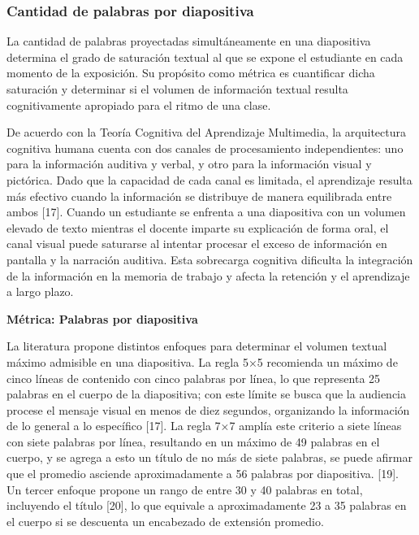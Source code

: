 \documentclass[11pt]{article}
\begin{document}
\subsubsection*{Cantidad de palabras por diapositiva}

La cantidad de palabras proyectadas simultáneamente en una diapositiva determina el grado de saturación textual al que se expone el estudiante en cada momento de la exposición. Su propósito como métrica es cuantificar dicha saturación y determinar si el volumen de información textual resulta cognitivamente apropiado para el ritmo de una clase.

De acuerdo con la Teoría Cognitiva del Aprendizaje Multimedia, la arquitectura cognitiva humana cuenta con dos canales de procesamiento independientes: uno para la información auditiva y verbal, y otro para la información visual y pictórica. Dado que la capacidad de cada canal es limitada, el aprendizaje resulta más efectivo cuando la información se distribuye de manera equilibrada entre ambos [17]. Cuando un estudiante se enfrenta a una diapositiva con un volumen elevado de texto mientras el docente imparte su explicación de forma oral, el canal visual puede saturarse al intentar procesar el exceso de información en pantalla y la narración auditiva. Esta sobrecarga cognitiva dificulta la integración de la información en la memoria de trabajo y afecta la retención y el aprendizaje a largo plazo.

\textbf{Métrica: Palabras por diapositiva}

La literatura propone distintos enfoques para determinar el volumen textual máximo admisible en una diapositiva. La regla 5×5 recomienda un máximo de cinco líneas de contenido con cinco palabras por línea, lo que representa 25 palabras en el cuerpo de la diapositiva; con este límite se busca que la audiencia procese el mensaje visual en menos de diez segundos, organizando la información de lo general a lo específico [17]. La regla 7×7 amplía este criterio a siete líneas con siete palabras por línea, resultando en un máximo de 49 palabras en el cuerpo, y se agrega a esto un título de no más de siete palabras, se puede afirmar que el promedio asciende aproximadamente a 56 palabras por diapositiva. [19]. Un tercer enfoque propone un rango de entre 30 y 40 palabras en total, incluyendo el título [20], lo que equivale a aproximadamente 23 a 35 palabras en el cuerpo si se descuenta un encabezado de extensión promedio.
\end{document}
